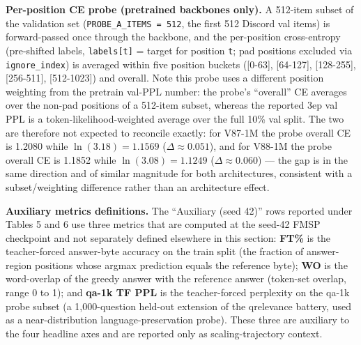 \documentclass[11pt]{article}
\begin{document}
\textbf{Per-position CE probe (pretrained backbones only).} A 512-item subset of the validation set (\texttt{PROBE\_A\_ITEMS = 512}, the first 512 Discord val items) is forward-passed once through the backbone, and the per-position cross-entropy (pre-shifted labels, \texttt{labels[t]} = target for position \texttt{t}; pad positions excluded via \texttt{ignore\_index}) is averaged within five position buckets ([0-63], [64-127], [128-255], [256-511], [512-1023]) and overall. Note this probe uses a different position weighting from the pretrain val-PPL number: the probe's ``overall'' CE averages over the non-pad positions of a 512-item subset, whereas the reported 3ep val PPL is a token-likelihood-weighted average over the full 10\% val split. The two are therefore not expected to reconcile exactly: for V87-1M the probe overall CE is 1.2080 while $\ln(3.18) = 1.1569$ ($\Delta \approx 0.051$), and for V88-1M the probe overall CE is 1.1852 while $\ln(3.08) = 1.1249$ ($\Delta \approx 0.060$) --- the gap is in the same direction and of similar magnitude for both architectures, consistent with a subset/weighting difference rather than an architecture effect.

\textbf{Auxiliary metrics definitions.} The ``Auxiliary (seed 42)'' rows reported under Tables 5 and 6 use three metrics that are computed at the seed-42 FMSP checkpoint and not separately defined elsewhere in this section: \textbf{FT\%} is the teacher-forced answer-byte accuracy on the train split (the fraction of answer-region positions whose argmax prediction equals the reference byte); \textbf{WO} is the word-overlap of the greedy answer with the reference answer (token-set overlap, range 0 to 1); and \textbf{qa-1k TF PPL} is the teacher-forced perplexity on the qa-1k probe subset (a 1,000-question held-out extension of the qrelevance battery, used as a near-distribution language-preservation probe). These three are auxiliary to the four headline axes and are reported only as scaling-trajectory context.
\end{document}
